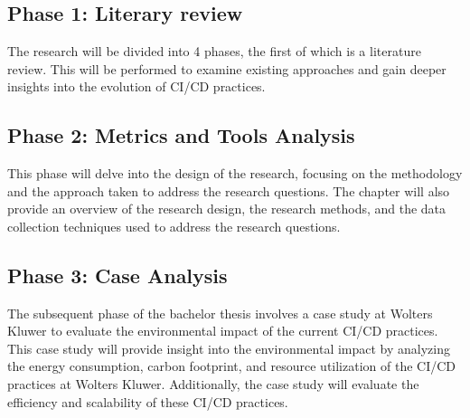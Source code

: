 
\chapter{}%
\label{ch:methodologie}


\section{Phase 1: Literary review}
The research will be divided into 4 phases, the first of which is a literature review. This will be performed to examine existing approaches and gain deeper insights into the evolution of CI/CD practices.

\section{Phase 2: Metrics and Tools Analysis}
This phase will delve into the design of the research, focusing on the methodology and the approach taken to address the research questions. The chapter will also provide an overview of the research design, the research methods, and the data collection techniques used to address the research questions.

\section{Phase 3: Case Analysis}
The subsequent phase of the bachelor thesis involves a case study at Wolters Kluwer to evaluate the environmental impact of the current CI/CD practices. This case study will provide insight into the environmental impact by analyzing the energy consumption, carbon footprint, and resource utilization of the CI/CD practices at Wolters Kluwer. Additionally, the case study will evaluate the efficiency and scalability of these CI/CD practices.

